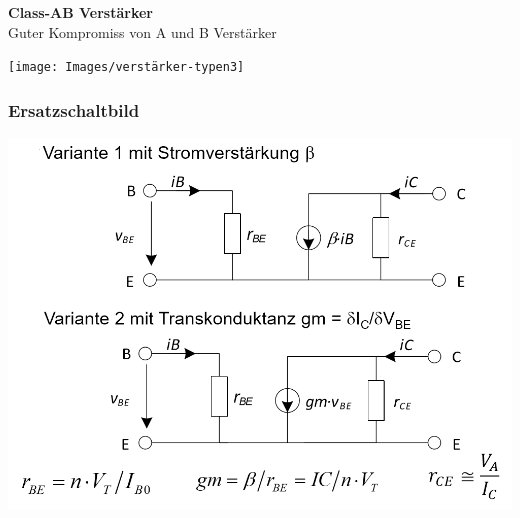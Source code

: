 \textbf{Class-AB Verstärker}\\
Guter Kompromiss von A und B Verstärker\\
\begin{minipage}{0.20\textwidth}
	\texttt{[image: Images/verstärker-typen3]}
\end{minipage}%
\begin{minipage}{0.30\textwidth}
\end{minipage}


\subsubsection{Ersatzschaltbild}
\includegraphics[width=\linewidth,keepaspectratio=true]{Images/bjt_esb}

